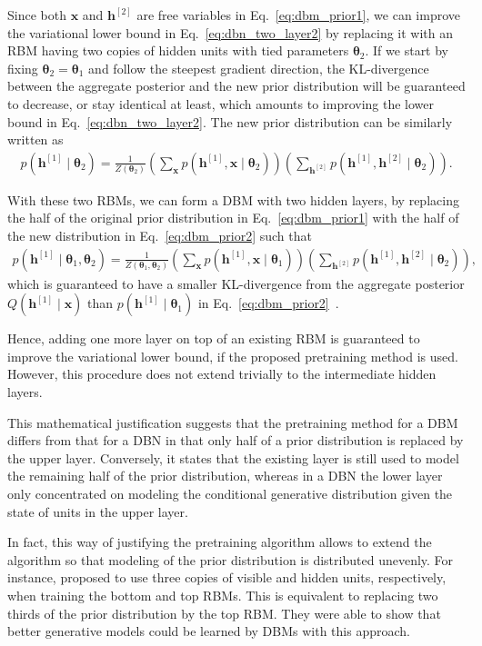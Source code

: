 \documentclass{now}
\newcommand{\qlay}[1]{\left[#1\right]}
\newcommand{\vect}[1]{\mathbf{#1}}
\newcommand{\vects}[1]{\boldsymbol{#1}}
\newcommand{\vh}[0]{\vect{h}}
\newcommand{\vx}[0]{\vect{x}}
\newcommand{\TT}[0]{{\vects{\theta}}}
\begin{document}
Since both $\vx$ and $\vh^{\qlay{2}}$ are free variables in
Eq.~\eqref{eq:dbm_prior1}, we can improve the variational lower bound in
Eq.~\eqref{eq:dbn_two_layer2} by replacing it with an RBM having two copies of
hidden units with tied parameters $\TT_2$. If we start by fixing $\TT_2=\TT_1$
and follow the steepest gradient direction, the KL-divergence between the
aggregate posterior and the new prior distribution will be guaranteed to
decrease, or stay identical at least, which amounts to improving the lower bound
in Eq.~\eqref{eq:dbn_two_layer2}.  The new prior distribution can be similarly
written as
\begin{align}
    \label{eq:dbm_prior2}
    p(\vh^{\qlay{1}} \mid \TT_2) = \frac{1}{Z(\TT_2)} \left(
    \sum_{\vx} p(\vh^{\qlay{1}}, \vx \mid \TT_2) \right) \left(
    \sum_{\vh^{\qlay{2}}} p(\vh^{\qlay{1}}, \vh^{\qlay{2}} \mid \TT_2)
    \right).
\end{align}

With these two RBMs, we can form a DBM with two hidden layers, by replacing the
half of the original prior distribution in Eq.~\eqref{eq:dbm_prior1} with the
half of the new distribution in Eq.~\eqref{eq:dbm_prior2} such that
\begin{align*}
    p(\vh^{\qlay{1}} \mid \TT_1, \TT_2) = \frac{1}{Z(\TT_1,
    \TT_2)} \left(
    \sum_{\vx} p(\vh^{\qlay{1}}, \vx \mid \TT_1) \right) \left(
    \sum_{\vh^{\qlay{2}}} p(\vh^{\qlay{1}}, \vh^{\qlay{2}} \mid \TT_2)
    \right),
\end{align*}
which is guaranteed to have a smaller KL-divergence from the aggregate posterior
$Q(\vh^{\qlay{1}}\mid \vx)$ than $p(\vh^{\qlay{1}} \mid \TT_1)$ in
Eq.~\eqref{eq:dbm_prior2}~\citep[See Appendix of][]{Salakhutdinov2012nc}. 

Hence, adding one more layer on top of an existing RBM is guaranteed to improve
the variational lower bound, if the proposed pretraining method is used.
However, this procedure does not extend trivially to the intermediate hidden
layers.

This mathematical justification suggests that the pretraining method for a DBM
differs from that for a DBN in that only half of a prior distribution is
replaced by the upper layer. Conversely, it states that the existing layer is
still used to model the remaining half of the prior distribution, whereas in a
DBN the lower layer only concentrated on modeling the conditional generative
distribution given the state of units in the upper layer. 

In fact, this way of justifying the pretraining algorithm allows to extend the
algorithm so that modeling of the prior distribution is distributed unevenly.
For instance, \citet{Salakhutdinov2012} proposed to use three copies of visible
and hidden units, respectively, when training the bottom and top RBMs.  This is
equivalent to replacing two thirds of the prior distribution by the top RBM.
They were able to show that better generative models could be learned by DBMs
with this approach.
\end{document}
